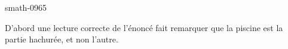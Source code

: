 
\begin{corrige}{smath-0965}

D'abord une lecture correcte de l'énoncé fait remarquer que la piscine est la partie hachurée, et non l'autre.
\begin{center}
   
\end{center}

\end{corrige}
